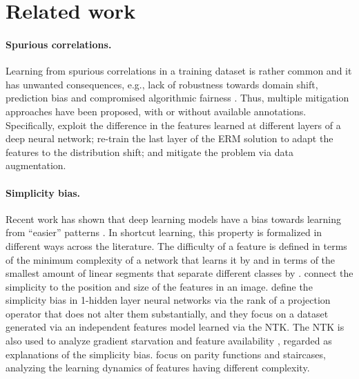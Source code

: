 \section{Related work}
\label{sec:rel}


\paragraph{Spurious correlations.} Learning from spurious correlations in a training dataset is rather common %
\cite{geirhos2018imagenettrained, arjovsky2020invariant, geirhos2020, sagawa2020a, xiao2021noise, singla2022salient} and it has %
unwanted consequences, e.g., lack of robustness towards domain shift, prediction bias and compromised algorithmic fairness \cite{zliobaite15, geirhos2018imagenettrained, zhou21combating, veitch2021counterfactual, seonguk22bias}.
Thus, multiple mitigation approaches have been proposed, with \cite{sagawa2020a, zhang2021coping} or without \cite{liu2021just, ahmed2021systematic} available annotations. Specifically, \cite{tiwari2023overcoming} exploit the difference in the features learned at different layers of a deep neural network; \cite{izmailov2022on, kirichenko2023last} re-train the last layer of the ERM solution to adapt the features to the distribution shift; and \cite{chang21augmentation, plumb2022finding} mitigate the problem via data augmentation.






\vspace{-0.2cm}

\paragraph{Simplicity bias.}
Recent work has shown that deep learning models have a bias towards learning from ``easier'' patterns \cite{Belkin19, rahaman2019spectral, kalimeris2019sgd}. In %
shortcut learning, this property is formalized in different ways across the %
literature. The difficulty of a feature is defined in terms of the minimum complexity of a network that learns it by \cite{Hermann2020whatshapes} and in terms of the smallest amount of linear segments that separate different classes by \cite{shah2020pitfalls}. \cite{moayeri2022hard}
connect the simplicity to the position and size of the features in an image. %
\cite{morwani2023simplicity} define the simplicity bias in 1-hidden layer neural networks via the rank of a projection operator that does not alter them substantially, and they focus on a dataset generated via an independent features model learned via the NTK. The NTK is also used to analyze gradient starvation \cite{pezeshki2021gradient} and feature availability \cite{hermann2024on}, regarded as explanations of the simplicity bias. \cite{qiu2024complexity} focus on parity functions and staircases, analyzing the learning dynamics of features having different complexity.


